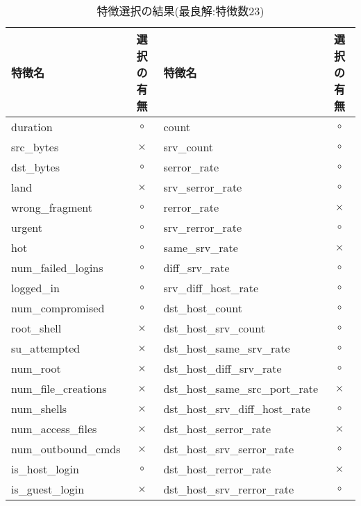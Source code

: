   \begin{table}[htbp]
  \setlength{\tabcolsep}{2pt} %
  \renewcommand{\arraystretch}{0.8} %
  \centering
  \caption{特徴選択の結果(最良解:特徴数23)}
  \begin{tabular}{|l|c|l|c|}
    \hline
    特徴名 & 選択の有無 & 特徴名 & 選択の有無   \\
    \hline
    duration & \(\circ\) & count & \(\circ\)  \\
    \hline
    src\_bytes &  \(\times\) & srv\_count & \(\circ\)   \\
    \hline
    dst\_bytes & \(\circ\) & serror\_rate & \(\circ\)   \\
    \cline{1-4}
    land & \(\times\) & srv\_serror\_rate & \(\circ\)   \\
    \cline{1-4}
    wrong\_fragment & \(\circ\) & rerror\_rate & \(\times\)   \\
    \cline{1-4}
    urgent & \(\circ\) & srv\_rerror\_rate & \(\circ\)   \\
    \cline{1-4}
    hot & \(\circ\) & same\_srv\_rate & \(\times\)   \\
    \cline{1-4}
    num\_failed\_logins & \(\circ\) & diff\_srv\_rate &  \(\circ\)  \\
    \cline{1-4}
    logged\_in & \(\circ\) & srv\_diff\_host\_rate &  \(\circ\)   \\
    \cline{1-4}
    num\_compromised & \(\circ\) & dst\_host\_count &\(\circ\)   \\
    \cline{1-4}
    root\_shell &\(\times\) & dst\_host\_srv\_count &\(\circ\)   \\
    \cline{1-4}
    su\_attempted &\(\times\) & dst\_host\_same\_srv\_rate & \(\circ\)   \\
    \cline{1-4}
    num\_root & \(\times\) & dst\_host\_diff\_srv\_rate &  \(\circ\)  \\
    \cline{1-4}
    num\_file\_creations &  \(\times\) & dst\_host\_same\_src\_port\_rate &   \(\times\)   \\
    \cline{1-4}
    num\_shells &  \(\times\) & dst\_host\_srv\_diff\_host\_rate & \(\circ\)  \\
    \cline{1-4}
    num\_access\_files &  \(\times\) & dst\_host\_serror\_rate & \(\times\)    \\
    \cline{1-4}
    num\_outbound\_cmds & \(\times\) & dst\_host\_srv\_serror\_rate & \(\circ\)   \\
    \cline{1-4}
    is\_host\_login & \(\circ\) &  dst\_host\_rerror\_rate & \(\times\)    \\
    \cline{1-4}
    is\_guest\_login & \(\times\) & dst\_host\_srv\_rerror\_rate & \(\circ\)  \\
    \cline{1-4}
\end{tabular}
\label{featuregood} 
\end{table}

